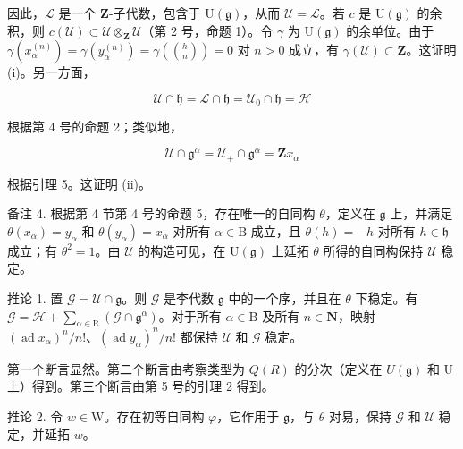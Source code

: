因此，\(\mathcal{L}\) 是一个 \(\mathbf{Z}\)-子代数，包含于 \(\mathrm{U}(\mathfrak{g})\)，从而 \(\mathcal{U} = \mathcal{L}\)。若 \(c\) 是 \(\mathrm{U}(\mathfrak{g})\) 的余积，则 \(c(\mathcal{U}) \subset \mathcal{U} \otimes_{\mathbf{Z}} \mathcal{U}\)（第 2 号，命题 1）。令 \(\gamma\) 为 \(\mathrm{U}(\mathfrak{g})\) 的余单位。由于 \(\gamma(x_{\alpha}^{(n)}) = \gamma(y_{\alpha}^{(n)}) = \gamma\left(\binom{h}{n}\right) = 0\) 对 \(n > 0\) 成立，有 \(\gamma(\mathcal{U}) \subset \mathbf{Z}\)。这证明 (i)。另一方面，

\[
\mathcal {U} \cap \mathfrak {h} = \mathcal {L} \cap \mathfrak {h} = \mathcal {U} _ {0} \cap \mathfrak {h} = \mathcal {H}
\]

根据第 4 号的命题 2；类似地，

\[
\mathcal {U} \cap \mathfrak {g} ^ {\alpha} = \mathcal {U} _ {+} \cap \mathfrak {g} ^ {\alpha} = \mathbf {Z} x _ {\alpha}
\]

根据引理 5。这证明 (ii)。

备注 4. 根据第 4 节第 4 号的命题 5，存在唯一的自同构 \(\theta\)，定义在 \(\mathfrak{g}\) 上，并满足 \(\theta(x_{\alpha}) = y_{\alpha}\) 和 \(\theta(y_{\alpha}) = x_{\alpha}\) 对所有 \(\alpha \in \mathrm{B}\) 成立，且 \(\theta(h) = -h\) 对所有 \(h \in \mathfrak{h}\) 成立；有 \(\theta^2 = 1\)。由 \(\mathcal{U}\) 的构造可见，在 \(\mathrm{U}(\mathfrak{g})\) 上延拓 \(\theta\) 所得的自同构保持 \(\mathcal{U}\) 稳定。

推论 1. 置 \(\mathcal{G} = \mathcal{U} \cap \mathfrak{g}\)。则 \(\mathcal{G}\) 是李代数 \(\mathfrak{g}\) 中的一个序，并且在 \(\theta\) 下稳定。有 \(\mathcal{G} = \mathcal{H} + \sum_{\alpha \in \mathrm{R}} (\mathcal{G} \cap \mathfrak{g}^{\alpha})\)。对于所有 \(\alpha \in \mathrm{B}\) 及所有 \(n \in \mathbf{N}\)，映射 \((\operatorname{ad} x_{\alpha})^{n} / n!\)、\((\operatorname{ad} y_{\alpha})^{n} / n!\) 都保持 \(\mathcal{U}\) 和 \(\mathcal{G}\) 稳定。

第一个断言显然。第二个断言由考察类型为 \(Q(R)\) 的分次（定义在 \(U(\mathfrak{g})\) 和 U 上）得到。第三个断言由第 5 号的引理 2 得到。

推论 2. 令 \(w \in \mathrm{W}\)。存在初等自同构 \(\varphi\)，它作用于 \(\mathfrak{g}\)，与 \(\theta\) 对易，保持 \(\mathcal{G}\) 和 \(\mathcal{U}\) 稳定，并延拓 \(w\)。

